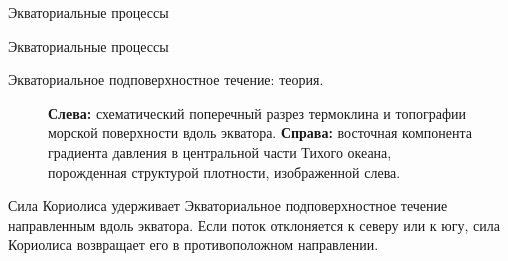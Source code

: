 \begin{chapter}{Экваториальные процессы}
\begin{section}{Экваториальные процессы}
\begin{paragraph}{Экваториальное подповерхностное течение: теория.}
\begin{figure}[t!]
\caption{\textbf{Слева:} схематический поперечный разрез 
термоклина и топографии морской поверхности
вдоль экватора.  
\textbf{Справа:} восточная компонента градиента давления в центральной части
Тихого океана, порожденная структурой плотности, изображенной слева.}
\label{fig:equatorsketch}
\end{figure}
%

Сила Кориолиса удерживает Экваториальное подповерхностное течение направленным
вдоль экватора. Если поток отклоняется к северу или к югу, сила Кориолиса 
возвращает его в противоположном направлении.
%
\end{paragraph}
\end{section}


\end{chapter}
